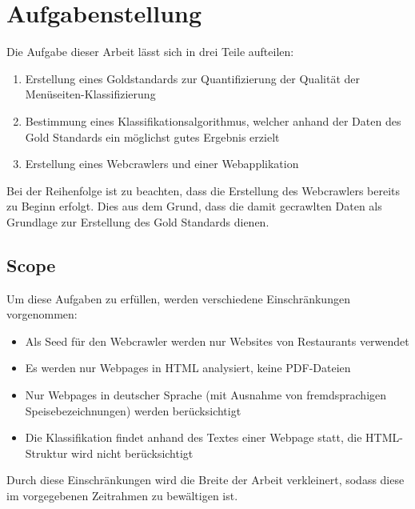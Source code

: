 \chapter{Aufgabenstellung}
Die Aufgabe dieser Arbeit lässt sich in drei Teile aufteilen:
\begin{enumerate}
	\item Erstellung eines Goldstandards zur Quantifizierung der Qualität der Menüseiten-Klassifizierung
	\item Bestimmung eines Klassifikationsalgorithmus, welcher anhand der Daten des Gold Standards ein möglichst gutes Ergebnis erzielt
	\item Erstellung eines Webcrawlers und einer Webapplikation
\end{enumerate}
Bei der Reihenfolge ist zu beachten, dass die Erstellung des Webcrawlers bereits zu Beginn erfolgt.
Dies aus dem Grund, dass die damit gecrawlten Daten als Grundlage zur Erstellung des Gold Standards dienen.
\section{Scope}
Um diese Aufgaben zu erfüllen, werden verschiedene Einschränkungen vorgenommen:
\begin{itemize}
	\item Als Seed für den Webcrawler werden nur Websites von Restaurants verwendet
	\item Es werden nur Webpages in HTML analysiert, keine PDF-Dateien
	\item Nur Webpages in deutscher Sprache (mit Ausnahme von fremdsprachigen Speisebezeichnungen) werden berücksichtigt
	\item Die Klassifikation findet anhand des Textes einer Webpage statt, die HTML-Struktur wird nicht berücksichtigt
\end{itemize}
Durch diese Einschränkungen wird die Breite der Arbeit verkleinert, sodass diese im vorgegebenen Zeitrahmen zu bewältigen ist.